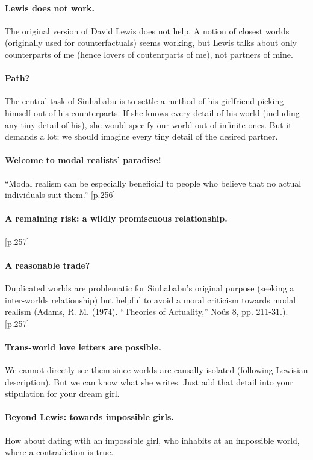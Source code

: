 \documentclass[
10pt, %
a4paper, %
twocolumn, %
landscape %
]{article}
\begin{document}
\paragraph{Lewis does not work.}
The original version of David Lewis does not help.
A notion of closest worlds (originally used for counterfactuals) seems working, but Lewis talks about only counterparts of me (hence lovers of coutenrparts of me), not partners of mine.

\paragraph{Path?}
The central task of Sinhababu is to settle a method of his girlfriend picking himself out of his counterparts.
If she knows every detail of his world (including any tiny detail of his), she would specify our world out of infinite ones.
But it demands a lot; we should imagine every tiny detail of the desired partner.

\paragraph{Welcome to modal realists' paradise!}
``Modal realism can be especially beneficial to people who believe that no
actual individuals suit them.'' [p.256]

\paragraph{A remaining risk: a wildly promiscuous relationship.} [p.257]

\paragraph{A reasonable trade?}
Duplicated worlds are problematic for Sinhababu's original purpose (seeking a inter-worlds relationship) but helpful to avoid a moral criticism towards modal realism (Adams, R. M. (1974). ``Theories of Actuality,'' Noûs 8, pp. 211-31.).  [p.257]

\paragraph{Trans-world love letters are possible.}
We cannot directly see them since worlds are causally isolated (following Lewisian description).
But we can know what she writes.
Just add that detail into your stipulation for your dream girl.

\paragraph{Beyond Lewis: towards impossible girls.}
How about dating wtih an impossible girl, who inhabits at an impossible world, where a contradiction is true.
\end{document}
